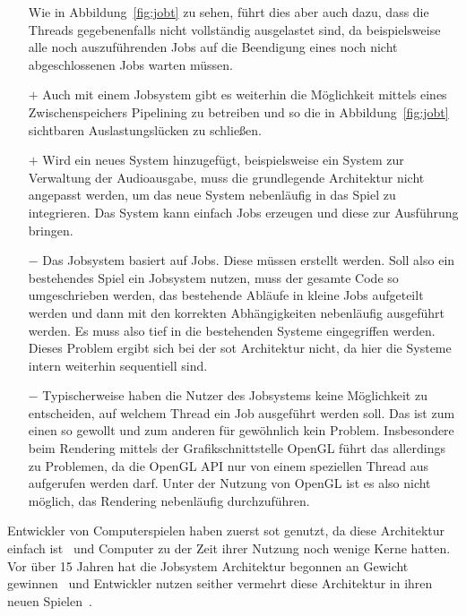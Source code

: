 \begin{itemize}
	Wie in Abbildung~\ref{fig:jobt} zu sehen, führt dies aber auch dazu, dass die Threads gegebenenfalls nicht vollständig ausgelastet sind, da beispielsweise alle noch auszuführenden Jobs auf die Beendigung eines noch nicht abgeschlossenen Jobs warten müssen.
	\item[$+$] Auch mit einem Jobsystem gibt es weiterhin die Möglichkeit mittels eines Zwischenspeichers Pipelining zu betreiben und so die in Abbildung~\ref{fig:jobt} sichtbaren Auslastungslücken zu schließen.
	\item[$+$] Wird ein neues System hinzugefügt, beispielsweise ein System zur Verwaltung der Audioausgabe, muss die grundlegende Architektur nicht angepasst werden, um das neue System nebenläufig in das Spiel zu integrieren. Das System kann einfach Jobs erzeugen und diese zur Ausführung bringen.
	\item[$-$] Das Jobsystem basiert auf Jobs. Diese müssen erstellt werden. Soll also ein bestehendes Spiel ein Jobsystem nutzen, muss der gesamte Code so umgeschrieben werden, das bestehende Abläufe in kleine Jobs aufgeteilt werden und dann mit den korrekten Abhängigkeiten nebenläufig ausgeführt werden. Es muss also tief in die bestehenden Systeme eingegriffen werden. Dieses Problem ergibt sich bei der \ac{sot} Architektur nicht, da hier die Systeme intern weiterhin sequentiell sind.
	\item[$-$] Typischerweise haben die Nutzer des Jobsystems keine Möglichkeit zu entscheiden, auf welchem Thread ein Job ausgeführt werden soll. Das ist zum einen so gewollt und zum anderen für gewöhnlich kein Problem. Insbesondere beim Rendering mittels der Grafikschnittstelle OpenGL führt das allerdings zu Problemen, da die OpenGL API nur von einem speziellen Thread aus aufgerufen werden darf. Unter der Nutzung von OpenGL ist es also nicht möglich, das Rendering nebenläufig durchzuführen.
\end{itemize}

Entwickler von Computerspielen haben zuerst \ac{sot} genutzt, da diese Architektur einfach ist~\cite{Genova2015,Tatarchuk2014} und Computer zu der Zeit ihrer Nutzung noch wenige Kerne hatten. Vor über 15 Jahren hat die Jobsystem Architektur begonnen an Gewicht gewinnen~\cite{Davies2006} und Entwickler nutzen seither vermehrt diese Architektur in ihren neuen Spielen~\cite{Tatarchuk2014,Genova2015,Gyrling2015,Hodgman2016}.


